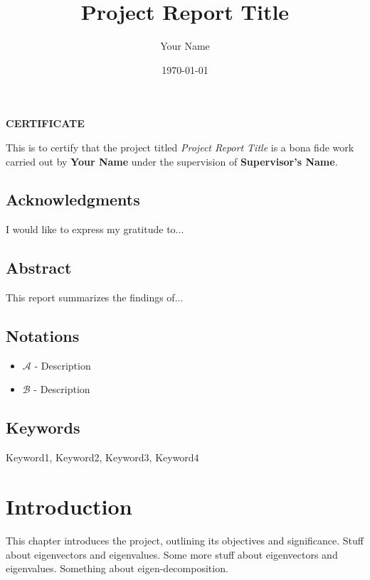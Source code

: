 \documentclass[a4paper,12pt]{report}
\title{Project Report Title}
\author{Your Name}
\date{\today}
\begin{document}
\maketitle

\newpage
\begin{center}
    \textbf{CERTIFICATE}
\end{center}
\vspace{1cm}
This is to certify that the project titled \textit{Project Report Title} is a bona fide work carried out by \textbf{Your Name} under the supervision of \textbf{Supervisor's Name}.

\newpage

\section*{Acknowledgments}
I would like to express my gratitude to...

\newpage

\section*{Abstract}
This report summarizes the findings of...

\newpage

\section*{Notations}
\begin{itemize}
    \item $\mathcal{A}$ - Description
    \item $\mathcal{B}$ - Description
\end{itemize}

\newpage

\section*{Keywords}
Keyword1, Keyword2, Keyword3, Keyword4

\newpage
\listoftables
\listoffigures
\tableofcontents
\newpage

\chapter{Introduction}
This chapter introduces the project, outlining its objectives and significance. Stuff about eigenvectors and 
eigenvalues. Some more stuff about eigenvectors and 
eigenvalues. Something about 
eigen-decomposition. 
\newpage
\end{document}
